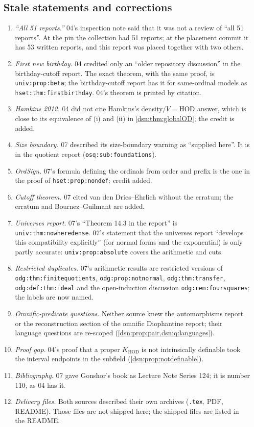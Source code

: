 \documentclass[11pt,a4paper]{article}
\numberwithin{equation}{section}
\theoremstyle{definition}
\theoremstyle{remark}
\newcommand{\HOD}{\mathrm{HOD}}
\newcommand{\KH}{K_{\HOD}}
\newcommand{\lbl}[1]{\nolinkurl{#1}}
\begin{document}
\subsection{Stale statements and corrections}\label{dsn:app:stale}

\begin{enumerate}
\item \emph{``All 51 reports.''} 04's inspection note said that it was not a
review of ``all 51 reports''. At the pin the collection had 51 reports; at
the placement commit it has 53 written reports, and this report was placed
together with two others.
\item \emph{First new birthday.} 04 credited only an ``older repository
discussion'' in the birthday-cutoff report. The exact theorem, with the same
proof, is \lbl{univ:prop:beta}; the birthday-cutoff report has it for same-ordinal
models as \lbl{hset:thm:firstbirthday}. 04's theorem is printed by citation.
\item \emph{Hamkins 2012.} 04 did not cite Hamkins's density/$V=\HOD$
answer, which is close to its equivalence of (i) and (ii) in
\cref{dsn:thm:globalOD}; the credit is added.
\item \emph{Size boundary.} 07 described its size-boundary warning as
``supplied here''. It is in the quotient report
(\lbl{osq:sub:foundations}).
\item \emph{OrdSign.} 07's formula defining the ordinals from order and
prefix is the one in the proof of \lbl{hset:prop:nondef}; credit added.
\item \emph{Cutoff theorem.} 07 cited van den Dries--Ehrlich without the
erratum; the erratum and Bournez--Guilmant are added.
\item \emph{Universes report.} 07's ``Theorem 14.3 in the report'' is
\lbl{univ:thm:nowheredense}. 07's statement that the universes report
``develops this compatibility explicitly'' (for normal forms and the
exponential) is only partly accurate: \lbl{univ:prop:absolute} covers the
arithmetic and cuts.
\item \emph{Restricted duplicates.} 07's arithmetic results are restricted
versions of \lbl{odg:thm:finitequotients}, \lbl{odg:prop:notnormal},
\lbl{odg:thm:transfer}, \lbl{odg:def:thm:ideal} and the open-induction
discussion \lbl{odg:rem:foursquares}; the labels are now named.
\item \emph{Omnific-predicate questions.} Neither source knew the
automorphisms report or the reconstruction section of the omnific
Diophantine report; their language questions are re-scoped
(\cref{dsn:prop:pair,dsn:q:languages}).
\item \emph{Proof gap.} 04's proof that a proper $\KH$ is not intrinsically
definable took the interval endpoints in the subfield
(\cref{dsn:prop:notdefinable}).
\item \emph{Bibliography.} 07 gave Gonshor's book as Lecture Note Series 124;
it is number 110, as 04 has it.
\item \emph{Delivery files.} Both sources described their own archives
(\texttt{.tex}, PDF, README). Those files are not shipped here; the shipped
files are listed in the README.
\end{enumerate}
\end{document}
